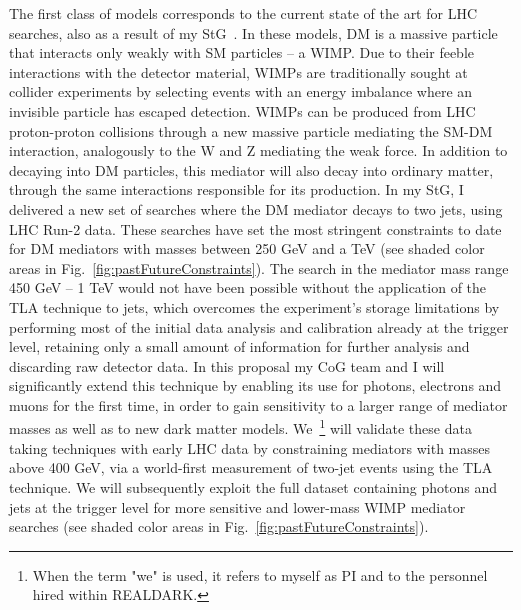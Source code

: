 \documentclass[11pt,a4paper]{article}
\begin{document}
The first class of models corresponds to the current state of the art for LHC searches, also as a result of my StG~\cite{Abercrombie:2015wmb,Boveia:2018yeb}. 
In these models, DM is a massive particle that interacts only weakly with SM particles -- a WIMP. 
Due to their feeble interactions with the detector material, WIMPs are traditionally sought at collider experiments by selecting events with an energy imbalance where an invisible particle has escaped detection. 
WIMPs can be produced from LHC proton-proton collisions through a new massive particle mediating the SM-DM interaction, analogously to the W and Z mediating the weak force. In addition to decaying into DM particles, this mediator will also decay into ordinary matter, through the same interactions responsible for its production. 
In my StG, I delivered a new set of searches where the DM mediator decays to two jets, using LHC Run-2 data. 
These searches have set the most stringent constraints to date for DM mediators with masses between 250 GeV and a TeV (see shaded \color{red} color \color{black} areas in Fig.~\ref{fig:pastFutureConstraints}). 
The search in the mediator mass range 450 GeV -- 1 TeV would not have been possible without the application of the TLA technique to jets, which overcomes the experiment's storage limitations by performing most of the initial data analysis and calibration already at the trigger level, retaining only a small amount of information for further analysis and discarding raw detector data. 
In this proposal my CoG team and I will significantly extend this technique by enabling its use for photons, electrons and muons for the first time, in order to gain sensitivity to a larger range of mediator masses as well as to new dark matter models. 
We~\footnote{When the term "we" is used, it refers to myself as PI and to the personnel hired within \textsc{REALDARK}.} will validate these data taking techniques with early LHC data by constraining mediators with masses above 400 GeV, via a world-first measurement of two-jet events using the TLA technique. 
We will subsequently exploit the full dataset containing photons and jets at the trigger level for more sensitive and lower-mass WIMP mediator searches (see shaded \color{red} color \color{black} areas in Fig.~\ref{fig:pastFutureConstraints}). 
\end{document}
